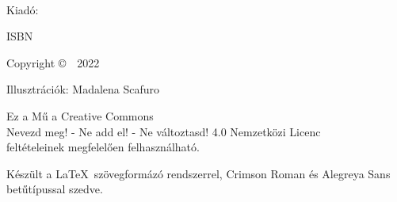\cleartoverso
\thispagestyle{empty}

{\copyrightsize
\centering
\setlength{\parindent}{0pt}%
\setlength{\parskip}{0.8\baselineskip}%

\thetitle\\
\theauthor

Kiadó: \thePublisher

ISBN \theISBN

Copyright \copyright\ \theauthor\ 2022

Illusztrációk: Madalena Scafuro

\vfill

\hspace*{-5mm}%
\parbox{\linewidth + 10mm}{%
\centering
Ez a Mű a Creative Commons\\
Nevezd meg! - Ne add el! - Ne változtasd! 4.0 Nemzetközi Licenc\\
feltételeinek megfelelően felhasználható.
}

Készült a \LaTeX\ szövegformázó rendszerrel, Crimson Roman és Alegreya Sans betűtípussal szedve.

\theEditionInfo

}

